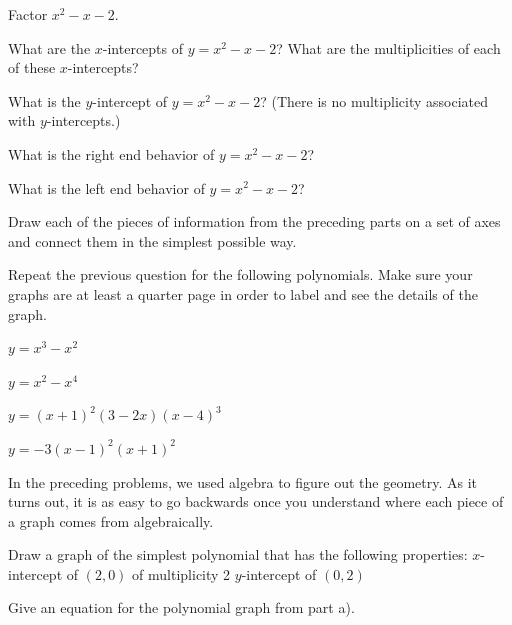 \bq
\be
\item Factor $x^2-x-2$.
\item What are the $x$-intercepts of $y=x^2-x-2$? What are the multiplicities of each of these $x$-intercepts?
\item What is the $y$-intercept of $y=x^2-x-2$? (There is no multiplicity associated with $y$-intercepts.)
\item What is the right end behavior of $y=x^2-x-2$?
\item What is the left end behavior of $y=x^2-x-2$?
\item Draw each of the pieces of information from the preceding parts on a set of axes and connect them in the simplest possible way.
\ee
\eq


\bq Repeat the previous question for the following polynomials. Make sure your graphs are at least a quarter page in order to label and see the details of the graph.
\be
\item $y=x^3-x^2$
\item $y=x^2-x^4$
\item $y=(x+1)^2(3-2x)(x-4)^3$
\item $y=-3(x-1)^2(x+1)^2$
\ee
\eq

In the preceding problems, we used algebra to figure out the geometry. As it turns out, it is as easy to go backwards once you understand where each piece of a graph comes from algebraically.
\bq
\be
\item Draw a graph of the simplest polynomial that has the following properties:
\subitem $x$-intercept of $(2,0)$ of multiplicity 2
\subitem $y$-intercept of $(0,2)$
\item Give an equation for the polynomial graph from part a).
\ee
\eq

